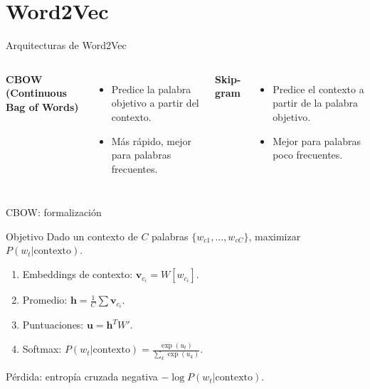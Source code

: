 \documentclass[aspectratio=169, 10pt, xcolor=table]{beamer}
\begin{document}
\section{Word2Vec}

\begin{frame}{Arquitecturas de Word2Vec}
    \begin{columns}[t]
        \textbf{CBOW (Continuous Bag of Words)}
        \begin{itemize}
            \item Predice la palabra objetivo a partir del contexto.
            \item Más rápido, mejor para palabras frecuentes.
        \end{itemize}
        \textbf{Skip-gram}
        \begin{itemize}
            \item Predice el contexto a partir de la palabra objetivo.
            \item Mejor para palabras poco frecuentes.
        \end{itemize}
    \end{columns}
\end{frame}

\begin{frame}{CBOW: formalización}
    \begin{block}{Objetivo}
        Dado un contexto de $C$ palabras $\{w_{c1}, \dots, w_{cC}\}$, maximizar $P(w_t | \text{contexto})$.
    \end{block}
    \begin{enumerate}
        \item Embeddings de contexto: $\mathbf{v}_{c_i} = W[w_{c_i}]$.
        \item Promedio: $\mathbf{h} = \frac{1}{C}\sum \mathbf{v}_{c_i}$.
        \item Puntuaciones: $\mathbf{u} = \mathbf{h}^T W'$.
        \item Softmax: $P(w_t|\text{contexto}) = \frac{\exp(u_t)}{\sum_k \exp(u_k)}$.
    \end{enumerate}
    Pérdida: entropía cruzada negativa $-\log P(w_t|\text{contexto})$.
\end{frame}
\end{document}
